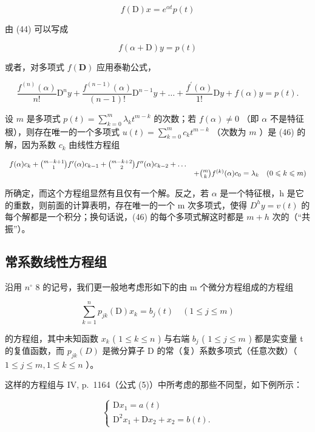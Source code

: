 \[
f (\mathrm{D}) x = e ^ {\alpha t} p (t)
\]

由 (44) 可以写成

\[
f (\alpha + \mathrm{D}) y = p (t)
\]

或者，对多项式 \(f(\mathbf{D})\) 应用泰勒公式，

\[
\frac {f ^ {(n)} (\alpha)}{n !} \mathrm{D} ^ {n} y + \frac {f ^ {(n - 1)} (\alpha)}{(n - 1) !} \mathrm{D} ^ {n - 1} y + \dots + \frac {f ^ {\prime} (\alpha)}{1 !} \mathrm{D} y + f (\alpha) y = p (t).\tag{46}
\]

设 \(m\) 是多项式 \(p(t) = \sum_{k=0}^{m} \lambda_k t^{m-k}\) 的次数；若 \(f(\alpha) \neq 0\) （即 \(\alpha\) 不是特征根），则存在唯一的一个多项式 \(u(t) = \sum_{k=0}^{m} c_k t^{m-k}\) （次数为 \(m\) ）是 (46) 的解，因为系数 \(c_k\) 由线性方程组

\[
\begin{array}{r l} f (\alpha) c _ {k} + \binom {m - k + 1} {1} f ^ {\prime} (\alpha) c _ {k - 1} + \binom {m - k + 2} {2} f ^ {\prime \prime} (\alpha) c _ {k - 2} + \dots \\ & + \binom {m} {k} f ^ {(k)} (\alpha) c _ {0} = \lambda_ {k} \quad (0 \leqslant k \leqslant m) \end{array}
\]

所确定，而这个方程组显然有且仅有一个解。反之，若 \(\alpha\) 是一个特征根，h 是它的重数，则前面的计算表明，存在唯一的一个 m 次多项式，使得 \(D^{h}y = v(t)\) 的每个解都是一个积分；换句话说，(46) 的每个多项式解这时都是 \(m + h\) 次的（“共振”）。

\subsection{常系数线性方程组}

沿用 \(n^{\circ}\) 8 的记号，我们更一般地考虑形如下的由 m 个微分方程组成的方程组

\[
\sum_ {k = 1} ^ {n} p _ {j k} (\mathrm{D}) x _ {k} = b _ {j} (t) \quad (1 \leqslant j \leqslant m)\tag{47}
\]

的方程组，其中未知函数 \(x_{k}\) ( \(1 \leqslant k \leqslant n\) ) 与右端 \(b_{j}\) ( \(1 \leqslant j \leqslant m\) ) 都是实变量 t 的复值函数，而 \(p_{jk}(D)\) 是微分算子 D 的常（复）系数多项式（任意次数）（ \(1 \leqslant j \leqslant m, 1 \leqslant k \leqslant n\) ）。

这样的方程组与 IV, p.~1164（公式 (5)）中所考虑的那些不同型，如下例所示：

\[
\left\{ \begin{array}{c} \mathrm{D} x _ {1} = a (t) \\ \mathrm{D} ^ {2} x _ {1} + \mathrm{D} x _ {2} + x _ {2} = b (t). \end{array} \right.\tag{48}
\]


